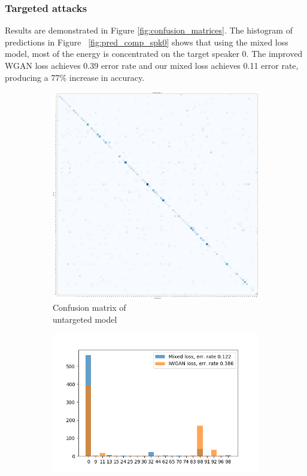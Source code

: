 \subsubsection{Targeted attacks}
Results are demonstrated in Figure
\ref{fig:confusion_matrices}. The histogram of predictions in Figure
~\ref{fig:pred_comp_spk0} shows that using the mixed loss model, most of the energy is concentrated on the target speaker 0. The improved WGAN loss achieves 0.39 error
rate and our mixed loss achieves 0.11 error rate, producing a 77\%
increase in accuracy. 
\begin{figure}[t]
    \centering
    \begin{subfigure}[b]{0.3\textwidth}
        \includegraphics[width=\textwidth]{./fig/conf_mat_cnn_knn.png}
        \caption{Confusion matrix of \\untargeted model}
        \label{fig:conf_mat_cnn_knn}
    \end{subfigure}
    \quad
    \begin{subfigure}[b]{0.4\textwidth}
        \includegraphics[width=\textwidth]{./fig/pred_comparisson_spk0.png}

\end{subfigure}
\end{figure}
